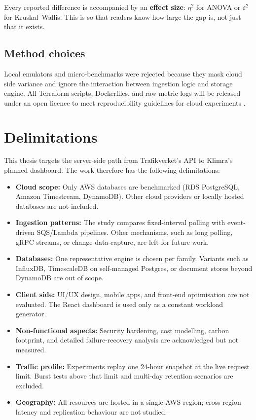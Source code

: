 \documentclass[nomenclature, english, biblatex]{kththesis}
\numberwithin{listing}{chapter}
\begin{document}
\noindent
Every reported difference is accompanied by an \textbf{effect size}: $\eta^{2}$ for ANOVA or $\varepsilon^{2}$ for Kruskal–Wallis. This is so that readers know how large the gap is, not just that it exists.


\subsection{Method choices}
Local emulators and micro-benchmarks were rejected because they mask cloud side variance and ignore the interaction between ingestion logic and storage engine. All Terraform scripts, Dockerfiles, and raw metric logs will be released under an open licence to meet reproducibility guidelines for cloud experiments \cite{PerformanceEvaluationMetrics}.






\section{Delimitations}
\label{sec:delimitations}
This thesis targets the server-side path from Trafikverket's \gls{API} to Klimra's planned dashboard. The work therefore has the following delimitations:

\begin{itemize}[noitemsep,leftmargin=*]
 \item \textbf{Cloud scope:} Only AWS databases are benchmarked (RDS PostgreSQL, Amazon Timestream, DynamoDB). Other cloud providers or locally hosted databases are not included.

 \item \textbf{Ingestion patterns:} The study compares fixed-interval polling with event-driven SQS/Lambda pipelines. Other mechanisms, such as long polling, gRPC streams, or change-data-capture, are left for future work.

 \item \textbf{Databases:} One representative engine is chosen per family. Variants such as InfluxDB, TimescaleDB on self-managed Postgres, or document stores beyond DynamoDB are out of scope.

 \item \textbf{Client side:} UI/UX design, mobile apps, and front-end optimisation are not evaluated. The React dashboard is used only as a constant workload generator.

 \item \textbf{Non-functional aspects:} Security hardening, cost modelling, carbon footprint, and detailed failure-recovery analysis are acknowledged but not measured.

 \item \textbf{Traffic profile:} Experiments replay one 24-hour snapshot at the live request limit. Burst tests above that limit and multi-day retention scenarios are excluded.

 \item \textbf{Geography:} All resources are hosted in a single AWS region; cross-region latency and replication behaviour are not studied.
\end{itemize}
\end{document}

